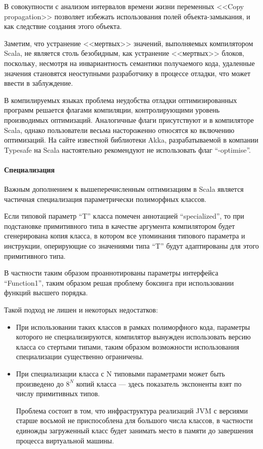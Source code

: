 В совокупности с анализом интервалов времени жизни переменных <<Copy propagation>> позволяет
избежать использования полей объекта-замыкания, и как следствие создания этого объекта.

Заметим, что устранение <<мертвых>> значений, выполняемых компилятором Scala, не является столь
безобидным, как устранение <<мертвых>> блоков, поскольку, несмотря на инвариантность семантики
получаемого кода, удаленные значения становятся неоступными разработчику в процессе отладки,
что может ввести в заблуждение.

В компилируемых языках проблема неудобства отладки оптимизированных программ решается флагами
компиляции, контролирующими уровень производимых оптимизаций.
Аналогичные флаги присутствуют и в компиляторе Scala, %
однако пользователи весьма настороженно относятся ко включению оптимизаций.
На сайте известной библиотеки Akka, разрабатываемой в компании Typesafe на Scala настоятельно
рекомендуют не использовать флаг ``-optimise''. %

\paragraph{Специализация}
Важным дополнением к вышеперечисленным оптимизациям в Scala является частичная специализация
параметрически полиморфных классов.

Если типовой параметр ``T'' класса помечен аннотацией ``specialized'', то при подстановке
примитивного типа в качестве аргумента компилятором будет сгенерирована копия класса, в котором
все упоминания типового параметра и инструкции, оперирующие со значениями типа ``T'' будут
адаптированы для этого примитивного типа.

В частности таким образом проаннотированы параметры интерфейса ``Function1'', таким образом решая
проблему боксинга при использовании функций высшего порядка.

Такой подход не лишен и некоторых недостатков:
\begin{itemize}
    \item При использовании таких классов в рамках полиморфного кода, параметры которого
    не специализируются, компилятор вынужден использовать версию класса со стертыми типами, таким
    образом возможности использования специализации существенно ограничены.
    \item При специализации класса с N типовыми параметрами может быть произведено до $8^N$ копий
    класса --- здесь показатель экспоненты взят по числу примитивных типов.

    Проблема состоит в том, что инфраструктура реализаций JVM с версиями старше восьмой
    не приспособлена для большого числа классов, в частности единожды загруженный класс будет
    занимать место в памяти до завершения процесса виртуальной машины.
\end{itemize}

